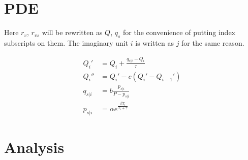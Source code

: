 \documentclass[12pt]{article}
\begin{document}
\section{PDE}

Here $r_v$, $r_{vs}$ will be rewritten as $Q$, $q_s$ for the convenience of putting index subscripts on them. The imaginary unit $i$ is written as $j$ for the same reason.

\begin{align*}
Q_i' &= Q_i + \frac{q_{s|i} - Q_i}{\tau}				\tag{$\tau$ constant} \\
Q_i'' &= Q_i' - c\left(Q_i' - Q_{i-1}'\right)			\tag{$c = u\Delta t/\Delta x$} \\
q_{s|i} &= b\frac{p_{s|i}}{P - p_{s|i}}				\tag{$b = M_l/M_a$; $P$ constant} \\
p_{s|i} &= \alpha e^{\frac{\beta T_i}{T_i + \gamma}}	\tag{$\alpha$, $\beta$, $\gamma$ constant}
\end{align*}

\section{Analysis}
\end{document}

